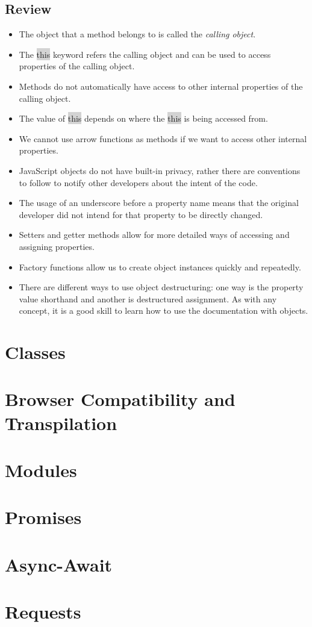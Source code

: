 \documentclass[11pt]{article}
\begin{document}
\subsection{Review}
\begin{itemize}[leftmargin = *]
\item The object that a method belongs to is called the \textit{calling object}.
\item The \colorbox{lightgray}{this} keyword refers the calling object and can be used to access properties of the calling object.
\item Methods do not automatically have access to other internal properties of the calling object.
\item The value of \colorbox{lightgray}{this} depends on where the \colorbox{lightgray}{this} is being accessed from.
\item We cannot use arrow functions as methods if we want to access other internal properties.
\item JavaScript objects do not have built-in privacy, rather there are conventions to follow to notify other developers about the intent of the code.
\item The usage of an underscore before a property name means that the original developer did not intend for that property to be directly changed.
\item Setters and getter methods allow for more detailed ways of accessing and assigning properties.
\item Factory functions allow us to create object instances quickly and repeatedly.
\item There are different ways to use object destructuring: one way is the property value shorthand and another is destructured assignment.
As with any concept, it is a good skill to learn how to use the documentation with objects.
\end{itemize}


\newpage
\section{Classes}
\newpage
\section{Browser Compatibility and Transpilation}
\newpage
\section{Modules}
\newpage
\section{Promises}
\newpage
\section{Async-Await}
\newpage
\section{Requests}
\end{document}
